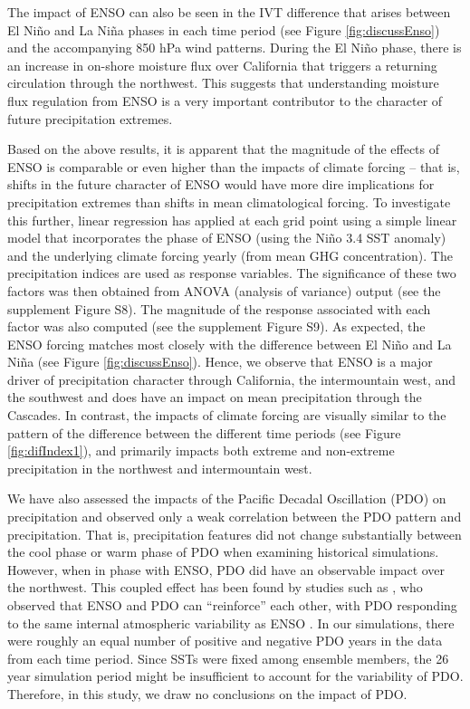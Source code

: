 \documentclass{ametsoc}
\begin{document}
The impact of ENSO can also be seen in the IVT difference that arises between El Ni\~no and La Ni\~na phases in each time period (see Figure \ref{fig:discussEnso}) and the accompanying 850 hPa wind patterns.  During the El Ni\~no phase, there is an increase in on-shore moisture flux over California that triggers a returning circulation through the northwest.  This suggests that understanding moisture flux regulation from ENSO is a very important contributor to the character of future precipitation extremes.

Based on the above results, it is apparent that the magnitude of the effects of ENSO is comparable or even higher than the impacts of climate forcing -- that is, shifts in the future character of ENSO would have more dire implications for precipitation extremes than shifts in mean climatological forcing.  To investigate this further, linear regression has applied at each grid point using a simple linear model that incorporates the phase of ENSO (using the Ni\~no 3.4 SST anomaly) and the underlying climate forcing yearly (from mean GHG concentration).  The precipitation indices are used as response variables. The significance of these two factors was then obtained from ANOVA (analysis of variance) output (see the supplement Figure S8). The magnitude of the response associated with each factor was also computed (see the supplement Figure S9).  As expected, the ENSO forcing matches most closely with the difference between El Ni\~no and La Ni\~na (see Figure \ref{fig:discussEnso}).  Hence, we observe that ENSO is a major driver of precipitation character through California, the intermountain west, and the southwest and does have an impact on mean precipitation through the Cascades. In contrast, the impacts of climate forcing are visually similar to the pattern of the difference between the different time periods (see Figure \ref{fig:difIndex1}), and primarily impacts both extreme and non-extreme precipitation in the northwest and intermountain west.


We have also assessed the impacts of the Pacific Decadal Oscillation (PDO) on precipitation and observed only a weak correlation between the PDO pattern and precipitation. That is, precipitation features did not change substantially between the cool phase or warm phase of PDO when examining historical simulations. However, when in phase with ENSO, PDO did have an observable impact over the northwest. This coupled effect has been found by studies such as \cite{gershunov1998interdecadal}, who observed that ENSO and PDO can ``reinforce'' each other, with PDO responding to the same internal atmospheric variability as ENSO \citep{pierce2002role}. In our simulations, there were roughly an equal number of positive and negative PDO years in the data from each time period. Since SSTs were fixed among ensemble members, the 26 year simulation period might be insufficient to account for the variability of PDO. Therefore, in this study, we draw no conclusions on the impact of PDO.
\end{document}
